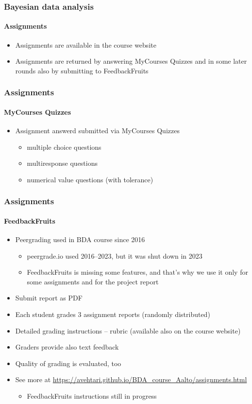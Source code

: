 \documentclass[english,t]{beamer}
\begin{document}
\begin{frame}
  \frametitle{Bayesian data analysis}  %
  \framesubtitle{Assignments}
  \begin{itemize}
  \item Assignments are available in the course website
  \item Assignments are returned by answering MyCourses Quizzes and in some
    later rounds also by submitting to FeedbackFruits
  \end{itemize}
\end{frame}

\begin{frame}
  \frametitle{Assignments}  %
  \framesubtitle{MyCourses Quizzes}
  \begin{itemize}
  \item Assignment answerd submitted via MyCourses Quizzes
    \begin{itemize}
    \item multiple choice questions
    \item multiresponse questions
    \item numerical value questions (with tolerance)
    \end{itemize}
  \end{itemize}
\end{frame}

\begin{frame}
  \frametitle{Assignments}  %
  \framesubtitle{FeedbackFruits}
  \begin{itemize}
  \item Peergrading used in BDA course since 2016
    \begin{itemize}
    \item peergrade.io used 2016--2023, but it was shut down in 2023
    \item FeedbackFruits is missing some features, and that's why we
      use it only for some assignments and for the project report
    \end{itemize}
  \item Submit report as PDF
  \item Each student grades 3 assignment reports (randomly distributed)
  \item Detailed grading instructions -- rubric (available also on the course website)
  \item Graders provide also text feedback
  \item Quality of grading is evaluated, too
  \item See more at
    \url{https://avehtari.github.io/BDA_course_Aalto/assignments.html}
    \begin{itemize}
    \item FeedbackFruits instructions still in progress
    \end{itemize}
  \end{itemize}
  
\end{frame}
\end{document}
